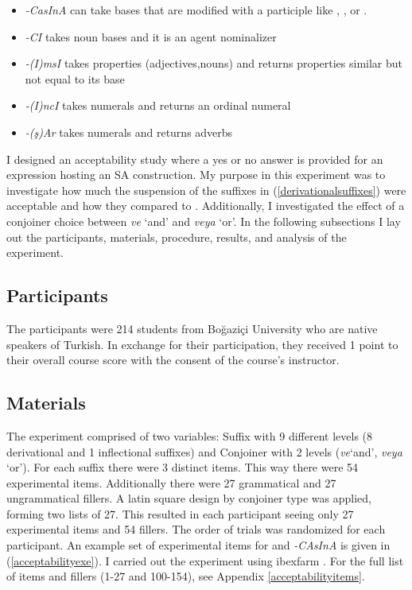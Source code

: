 \begin{exe}
\ex \label{suffixesdiffer}
\begin{itemize}
\item \textit{-CasInA} can take bases that are modified with a participle like {\Prf}, {\Prog}, or {\Aor}. 

\item \textit{-CI} takes noun bases and it is an agent nominalizer

\item \textit{-(I)msI} takes properties (adjectives,nouns) and returns properties similar but not equal to its base

\item \textit{-(I)ncI} takes numerals and returns an ordinal numeral

\item \textit{-(ş)Ar} takes numerals and returns adverbs

\end{itemize}
\end{exe}

I designed an acceptability study where a yes or no answer is provided for an expression hosting an SA construction. My purpose in this experiment was to investigate how much the suspension of the suffixes in (\ref{derivationalsuffixes}) were acceptable and how they compared to {\Acc}. Additionally, I investigated the effect of a conjoiner choice between \textit{ve} `and' and \textit{veya} `or'. In the following subsections I lay out the participants, materials, procedure, results, and analysis of the experiment.

\subsection{Participants}

The participants were 214 students from Boğaziçi University who are native speakers of Turkish. In exchange for their participation, they received 1 point to their overall course score with the consent of the course's instructor.


\subsection{Materials}

The experiment comprised of two variables: Suffix with 9 different levels (8 derivational and 1 inflectional {\Acc} suffixes) and Conjoiner with 2 levels (\textit{ve}`and', \textit{veya} `or'). For each suffix there were 3 distinct items. This way there were 54 experimental items. Additionally there were 27 grammatical and 27 ungrammatical fillers. A latin square design by conjoiner type was applied, forming two lists of 27. This resulted in each participant seeing only 27 experimental items and 54 fillers. The order of trials was randomized for each participant. An example set of experimental items for {\Acc} and \textit{-CAsInA} is given in (\ref{acceptabilityexe}). I carried out the experiment using ibexfarm \citep{drummond2013ibex}. For the full list of items and fillers (1-27 and 100-154), see Appendix \ref{acceptabilityitems}.


